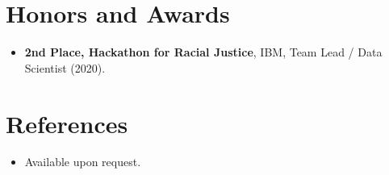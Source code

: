 \documentclass[11pt,a4paper,sans]{moderncv}
\begin{document}
\section{Honors and Awards}
\vspace{1pt}
\begin{itemize}
\item{\textbf{2nd Place, Hackathon for Racial Justice}, IBM, Team Lead / Data Scientist (2020).}
\end{itemize}


\section{References}
\vspace{1pt}
\begin{itemize}
\item{Available upon request.}
\end{itemize}
\end{document}
